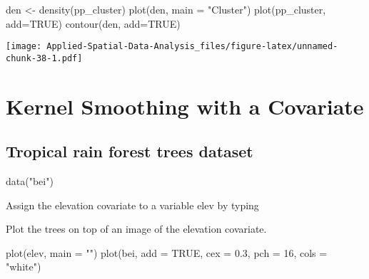 \documentclass[
]{book}
\newenvironment{Shaded}{\begin{snugshade}}{\end{snugshade}}
\newcommand{\AttributeTok}[1]{\textcolor[rgb]{0.77,0.63,0.00}{#1}}
\newcommand{\ConstantTok}[1]{\textcolor[rgb]{0.00,0.00,0.00}{#1}}
\newcommand{\DecValTok}[1]{\textcolor[rgb]{0.00,0.00,0.81}{#1}}
\newcommand{\FloatTok}[1]{\textcolor[rgb]{0.00,0.00,0.81}{#1}}
\newcommand{\FunctionTok}[1]{\textcolor[rgb]{0.00,0.00,0.00}{#1}}
\newcommand{\NormalTok}[1]{#1}
\newcommand{\OtherTok}[1]{\textcolor[rgb]{0.56,0.35,0.01}{#1}}
\newcommand{\SpecialCharTok}[1]{\textcolor[rgb]{0.00,0.00,0.00}{#1}}
\newcommand{\StringTok}[1]{\textcolor[rgb]{0.31,0.60,0.02}{#1}}
\begin{document}
\begin{Shaded}
\begin{Highlighting}[]
\NormalTok{den }\OtherTok{\textless{}{-}} \FunctionTok{density}\NormalTok{(pp\_cluster)}
\FunctionTok{plot}\NormalTok{(den, }\AttributeTok{main =} \StringTok{"Cluster"}\NormalTok{)}
\FunctionTok{plot}\NormalTok{(pp\_cluster, }\AttributeTok{add=}\ConstantTok{TRUE}\NormalTok{)}
\FunctionTok{contour}\NormalTok{(den, }\AttributeTok{add=}\ConstantTok{TRUE}\NormalTok{)}
\end{Highlighting}
\end{Shaded}

\texttt{[image: Applied-Spatial-Data-Analysis\_files/figure-latex/unnamed-chunk-38-1.pdf]}

\hypertarget{kernel-smoothing-with-a-covariate}{%
\section{Kernel Smoothing with a Covariate}\label{kernel-smoothing-with-a-covariate}}

\hypertarget{tropical-rain-forest-trees-dataset}{%
\subsection{Tropical rain forest trees dataset}\label{tropical-rain-forest-trees-dataset}}

\begin{Shaded}
\begin{Highlighting}[]
\FunctionTok{data}\NormalTok{(}\StringTok{"bei"}\NormalTok{)}
\end{Highlighting}
\end{Shaded}

Assign the elevation covariate to a variable elev by typing

\begin{Shaded}
\end{Shaded}

Plot the trees on top of an image of the elevation covariate.

\begin{Shaded}
\begin{Highlighting}[]
\FunctionTok{plot}\NormalTok{(elev, }\AttributeTok{main =} \StringTok{""}\NormalTok{)}
\FunctionTok{plot}\NormalTok{(bei, }\AttributeTok{add =} \ConstantTok{TRUE}\NormalTok{, }\AttributeTok{cex =} \FloatTok{0.3}\NormalTok{, }\AttributeTok{pch =} \DecValTok{16}\NormalTok{, }\AttributeTok{cols =} \StringTok{"white"}\NormalTok{)}
\end{Highlighting}
\end{Shaded}
\end{document}
